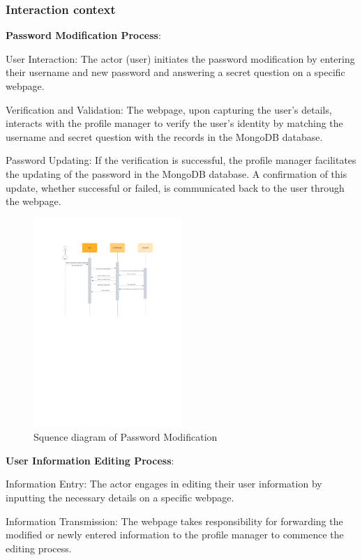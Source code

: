 \documentclass[conference]{IEEEtran}
\begin{document}
\subsubsection{\textbf{Interaction context }}
\textbf{ }

\textbf{ Password Modification Process}:

User Interaction: The actor (user) initiates the password modification by entering their username and new password and answering a secret question on a specific webpage.

Verification and Validation: The webpage, upon capturing the user's details, interacts with the profile manager to verify the user's identity by matching the username and secret question with the records in the MongoDB database.

Password Updating: If the verification is successful, the profile manager facilitates the updating of the password in the MongoDB database. A confirmation of this update, whether successful or failed, is communicated back to the user through the webpage.
\begin{figure}[htbp]
	\centerline{\includegraphics[width=0.5\textwidth]{Diagram_of_Editing_Info_and_Password/Sequence_diagram_of_Changing_psw.pdf}}
	\caption{Squence diagram of Password Modification }
	\label{Sequence_diagram_of_Changing_psw}
\end{figure}
\textbf{ User Information Editing Process}:

Information Entry: The actor engages in editing their user information by inputting the necessary details on a specific webpage.

Information Transmission: The webpage takes responsibility for forwarding the modified or newly entered information to the profile manager to commence the editing process.
\end{document}

